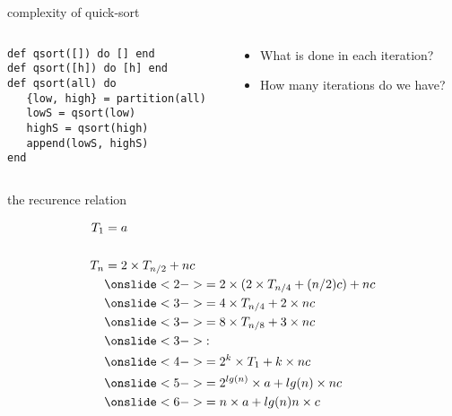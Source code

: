 \begin{frame}[fragile]{complexity of quick-sort}

\begin{columns}
   \begin{column}{.5\linewidth}
    \begin{verbatim}
def qsort([]) do [] end
def qsort([h]) do [h] end
def qsort(all) do 
   {low, high} = partition(all)
   lowS = qsort(low)
   highS = qsort(high)
   append(lowS, highS)
end
    \end{verbatim}
   \end{column}
   \begin{column}{.5\linewidth}
    \begin{itemize}
      \pause \item What is done in each iteration?
      \pause \item How many iterations do we have?       
    \end{itemize}
   \end{column}
\end{columns}


\end{frame}

\begin{frame}{the recurence relation}

\begin{equation}  
\begin{split}
    T_1 & = a \\
\\
T_n & = 2 \times T_{n/2} + nc \\ 
    &\onslide<2->{ = 2 \times ( 2 \times T_{n/4} + (n/2)c ) + nc }\\
    &\onslide<3->{ = 4 \times T_{n/4} + 2 \times nc}\\
    &\onslide<3->{ = 8 \times T_{n/8} + 3 \times nc}\\
    &\onslide<3->{ : }\\
    &\onslide<4->{ = 2^k \times T_1 + k \times nc }\\
    &\onslide<5->{ = 2^{lg(n)} \times a  + lg(n) \times nc }\\
    &\onslide<6->{ = n \times a + lg(n)n \times c}\\
  \end{split}
\end{equation}

\end{frame}


